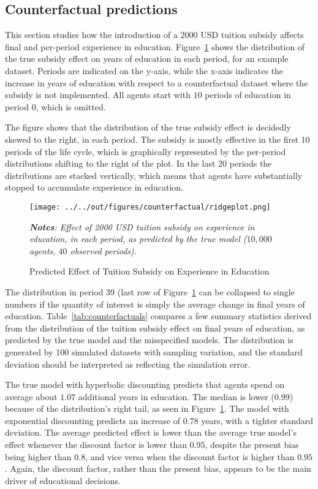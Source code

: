 \subsection{Counterfactual predictions}

This section studies how the introduction of a 2000 USD tuition subsidy affects final and per-period experience in education. Figure~\ref{fig:ridgeplot} shows the distribution of the true subsidy effect on years of education in each period, for an example dataset. Periods are indicated on the y-axis, while the x-axis indicates the increase in years of education with respect to a counterfactual dataset where the subsidy is not implemented. All agents start with $10$ periods of education in period $0$, which is omitted. 

The figure shows that the distribution of the true subsidy effect is decidedly skewed to the right, in each period. The subsidy is mostly effective in the first 10 periods of the life cycle, which is graphically represented by the per-period distributions shifting to the right of the plot. In the last 20 periods the distributions are stacked vertically, which means that agents have substantially stopped to accumulate experience in education. 

\begin{figure}[!t]
\centering
\captionsetup{justification=centering}
\caption{Predicted Effect of Tuition Subsidy on Experience in Education}
\label{fig:ridgeplot}
\texttt{[image: ../../out/figures/counterfactual/ridgeplot.png]}

\bigskip
\footnotesize
\raggedright
\textit{\textbf{Notes}: Effect of 2000 USD tuition subsidy on experience in education, in each period, as predicted by the true model ($10,000$ agents, $40$ observed periods).}
\end{figure}

The distribution in period 39 (last row of Figure~\ref{fig:ridgeplot} can be collapsed to single numbers if the quantity of interest is simply the average change in final years of education. Table~\ref{tab:counterfactuals} compares a few summary statistics derived from the distribution of the tuition subsidy effect on final years of education, as predicted by the true model and the misspecified models. The distribution is generated by 100 simulated datasets with sampling variation, and the standard deviation should be interpreted as reflecting the simulation error. 

The true model with hyperbolic discounting predicts that agents spend on average about $1.07$ additional years in education. The median is lower ($0.99$) because of the distribution's right tail, as seen in Figure~\ref{fig:ridgeplot}. The model with exponential discounting predicts an increase of $0.78$ years, with a tighter standard deviation. The average predicted effect is lower than the average true model's effect whenever the discount factor is lower than $0.95$, despite the present bias being higher than $0.8$, and vice versa when the discount factor is higher than $0.95$. Again, the discount factor, rather than the present bias, appears to be the main driver of educational decisions.

